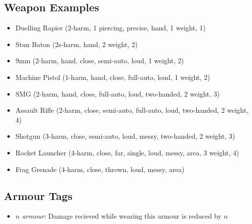 \subsection{Weapon Examples}
\begin{itemize}
\item Duelling Rapier (2-harm, 1 piercing, precise, hand, 1 weight, 1\money)
\item Stun Baton (2s-harm, hand, 2 weight, 2\money)
\item 9mm (2-harm, hand, close, semi-auto, loud, 1 weight, 2\money)
\item Machine Pistol (1-harm, hand, close, full-auto, loud, 1 weight, 2\money)
\item SMG (2-harm, hand, close, full-auto, loud, two-handed, 2 weight, 3\money)
\item Assault Rifle (2-harm, close, semi-auto, full-auto, loud, two-handed, 2 weight, 4\money)
\item Shotgun (3-harm, close, semi-auto, loud, messy, two-handed, 2 weight, 3\money)
\item Rocket Launcher (4-harm, close, far, single, loud, messy, area, 3 weight, 4\money)
\item Frag Grenade (4-harm, close, thrown, loud, messy, area)
\end{itemize}

\subsection{Armour Tags}
\begin{itemize}
\item \textit{$n$ armour}: Damage recieved while wearing this armour is reduced by $n$
\end{itemize}